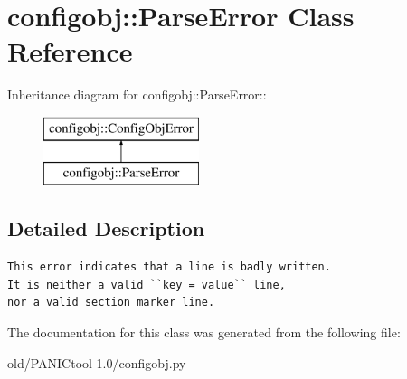 \section{configobj::Parse\-Error Class Reference}
\label{classconfigobj_1_1ParseError}
Inheritance diagram for configobj::Parse\-Error::\begin{figure}[H]
\begin{center}
\leavevmode
\includegraphics[height=2cm]{classconfigobj_1_1ParseError}
\end{center}
\end{figure}


\subsection{Detailed Description}


\footnotesize\begin{verbatim}
This error indicates that a line is badly written.
It is neither a valid ``key = value`` line,
nor a valid section marker line.
\end{verbatim}
\normalsize
 



The documentation for this class was generated from the following file:\begin{CompactItemize}
\item 
old/PANICtool-1.0/configobj.py\end{CompactItemize}
